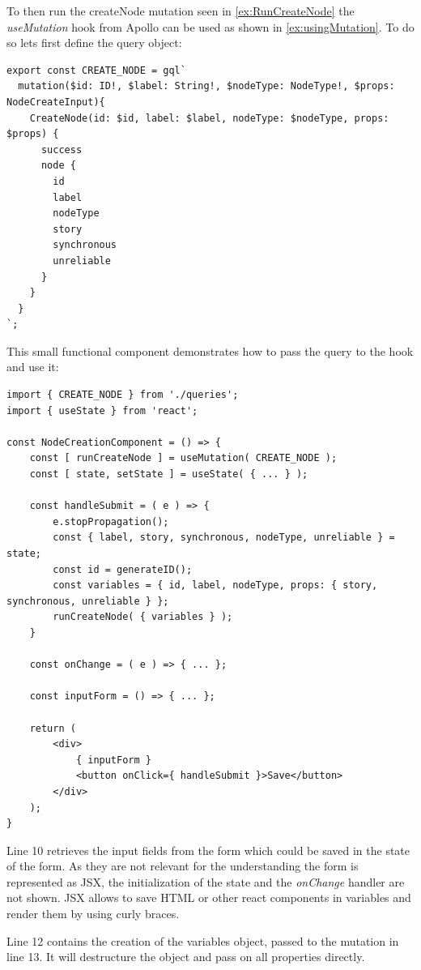 To then run the createNode mutation seen in \autoref{ex:RunCreateNode} the \emph{useMutation} hook from Apollo can be used as shown in \autoref{ex:usingMutation}. To do so lets first define the query object:

\begin{lstlisting}[label={ex:DefQuery},caption={Mutation to Create a Node in the Database}]
export const CREATE_NODE = gql`
  mutation($id: ID!, $label: String!, $nodeType: NodeType!, $props: NodeCreateInput){
    CreateNode(id: $id, label: $label, nodeType: $nodeType, props: $props) {
      success
      node {
        id
        label
        nodeType
        story
        synchronous
        unreliable
      }
    }
  }
`;
\end{lstlisting}

This small functional component demonstrates how to pass the query to the hook and use it:

\lstset{language=JavaScript}
\begin{lstlisting}[caption={Using the Query in a Component (no actual application code)}]
import { CREATE_NODE } from './queries';
import { useState } from 'react';

const NodeCreationComponent = () => {
	const [ runCreateNode ] = useMutation( CREATE_NODE );
	const [ state, setState ] = useState( { ... } );
	
	const handleSubmit = ( e ) => {
		e.stopPropagation();
		const { label, story, synchronous, nodeType, unreliable } = state; 
		const id = generateID();
		const variables = { id, label, nodeType, props: { story, synchronous, unreliable } }; 
		runCreateNode( { variables } );
	}

	const onChange = ( e ) => { ... };
	
	const inputForm = () => { ... };
	
	return (
		<div>
			{ inputForm }
			<button onClick={ handleSubmit }>Save</button>
		</div>	
	);
}
\end{lstlisting}
Line 10 retrieves the input fields from the form which could be saved in the state of the form. As they are not relevant for the understanding the form is represented as JSX, the initialization of the state and the \emph{onChange} handler are not shown. JSX allows to save HTML or other react components in variables and render them by using curly braces.

Line 12 contains the creation of the variables object, passed to the mutation in line 13. It will destructure the object and pass on all properties directly.

